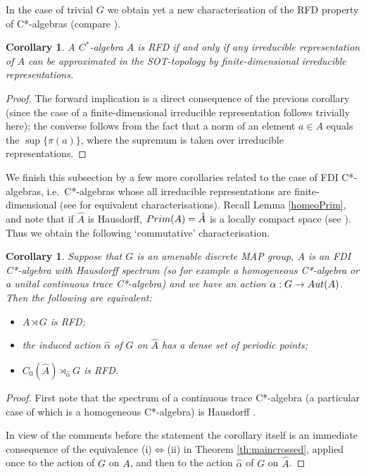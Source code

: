 \documentclass[11 pt, leqno, hidelinks]{amsart}%
\theoremstyle{plain}
\newtheorem{corollary}[theorem]{Corollary}
\numberwithin{equation}{section}
\newcommand{\Prim}{\textup{Prim}}
\begin{document}
In the case of trivial $G$ we obtain yet a new characterisation of the RFD property of C*-algebras (compare \cite[Theorem 2.4]{ExelLoring}).


\begin{corollary}\label{RFDnew}
A $C^*$-algebra $A$ is RFD if and only if any irreducible representation of $A$ can be approximated in the SOT-topology by finite-dimensional irreducible  representations.
\end{corollary}
\begin{proof}
The forward implication is a direct consequence of the previous corollary (since the case of a finite-dimensional  irreducible representation follows trivially here); the converse follows from the fact that a norm of an element $a \in A$ equals the $\sup\{\pi(a)\}$, where the supremum is taken over irreducible representations.
\end{proof}









We finish this subsection by a few more corollaries related to the case of FDI C*-algebras, i.e.\ C*-algebras whose all irreducible representations are finite-dimensional (see \cite[Theorem 4.4]{CSFDI} for equivalent characterisations). Recall Lemma \ref{homeoPrim}, and note that  if $\hat{A}$ is Hausdorff, $\Prim(A)= \hat{A}$ is a locally compact space (see \cite[Subsection 5.1]{DanaIan}). Thus we obtain the following `commutative' characterisation.

\begin{corollary} \label{cor:comm}
	Suppose that $G$ is an amenable discrete MAP group, $A$ is an FDI C*-algebra with Hausdorff spectrum (so for example a homogeneous C*-algebra or a unital continuous trace C*-algebra) and we have an action $\alpha:G \to \textup{Aut}(A)$. Then the following are equivalent:
	\begin{itemize}
		\item[(i)] $A \rtimes G$ is RFD;
		\item[(ii)] the induced action $\hat{\alpha}$ of $G$ on $\hat{A}$ has a dense set of periodic points;
		\item[(iii)] $C_0(\hat{A})\rtimes_{\hat{\alpha}} G$ is RFD.
	\end{itemize}	
\end{corollary}
\begin{proof}
		First note that the spectrum of a continuous trace C*-algebra (a particular case of which is a homogeneous C*-algebra) is Hausdorff  \cite[section IV.1]{Blackadar}.
		
		In view of the comments before the statement the corollary itself is an immediate consequence of the equivalence (i)$\Longleftrightarrow$(ii) in Theorem \ref{th:maincrossed}, applied once to the action of $G$ on $A$, and then to the action $\hat{\alpha}$ of $G$ on $\hat{A}$.		
\end{proof}
\end{document}
